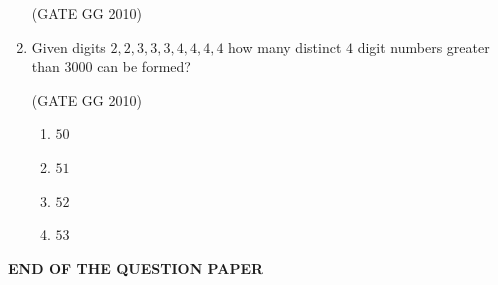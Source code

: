 \documentclass[journal]{IEEEtran}
\begin{document}
\begin{enumerate}[start=26]
\hfill(GATE GG 2010)

\begin{enumerate}
\end{enumerate}

\item Given digits $2, 2, 3, 3, 3, 4, 4, 4, 4$ how many distinct $4$ digit numbers greater than $3000$ can be formed?

\hfill (GATE GG 2010) 
\begin{multicols}{4}

\begin{enumerate}
   
        \item $50$
        \item $51$
        \item $52$
        \item $53$
        
\end{enumerate}
\end{multicols}
\end{enumerate}
\textbf{END OF THE QUESTION PAPER}
\end{document}
